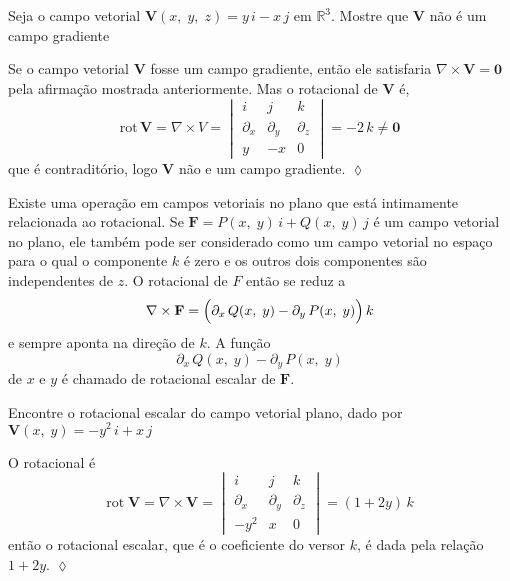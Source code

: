 \begin{exc}
	Seja o campo vetorial $\mathbf{V}(x,\; y, \; z)=y\, i-x\, j$ em $\mathbb{R}^{3}$. Mostre que $\mathbf{V}$ não é um campo gradiente
\end{exc}

\solo
Se o campo vetorial $\mathbf{V}$ fosse um campo gradiente, então ele satisfaria $\nabla\times \mathbf{V} = \mathbf{0}$ pela afirmação mostrada anteriormente. Mas o rotacional de $\mathbf{V}$ é,
\begin{equation*}
	\mathrm{rot}\, \mathbf{V} = \nabla\times V=
	\begin{vmatrix}
		i & j & k \\
		\partial_{x} & \partial_{y} & \partial_{z} \\
		y & -x & 0
	\end{vmatrix}= -2\,k  \neq \mathbf{0}
\end{equation*}
que é  contraditório, logo $\mathbf{V}$ não e um campo gradiente. \hfill $\lozenge$

\bigskip
Existe uma operação em campos vetoriais no plano que está intimamente relacionada ao rotacional. Se $\mathbf{F} = P(x,\; y)\,i + Q(x,\; y)\,j$ é um campo
vetorial no plano, ele também pode ser considerado como um campo vetorial no espaço para o qual o componente $k$ é zero e os outros dois componentes são independentes de $z$. O rotacional de $F$ então se reduz a
\begin{equation*}
	\nabla \times \mathbf{F} = \Bigl(\partial_{x}\, Q(x,\; y) -\partial_{y}\, P(x,\; y)\Bigr)\, k
\end{equation*}
e sempre aponta na direção de $k$. A função
\begin{equation*}
	\partial_{x}\, Q(x,\; y) -\partial_{y}\, P(x,\; y)
\end{equation*}
de $x$ e $y$ é chamado de \textsf{rotacional escalar} de $\mathbf{F}$.

\begin{exc}
	Encontre o rotacional escalar do campo vetorial plano, dado por $\mathbf{V}(x,\; y) = -y^{2}\,i + x\, j$
\end{exc}

\solo
O rotacional é
\begin{equation*}
	\mathrm{rot}\; \mathbf{V} =\nabla \times \mathbf{V}=
	\begin{vmatrix}
		i & j & k \\
		\partial_{x} & \partial_{y} & \partial_{z} \\
		-y^{2} & x & 0
	\end{vmatrix}= (1+2y)\, k
\end{equation*}
então o \textsf{rotacional escalar}, que é o coeficiente do versor $k$, é dada pela relação $1+2y$. \hfill $\lozenge$

